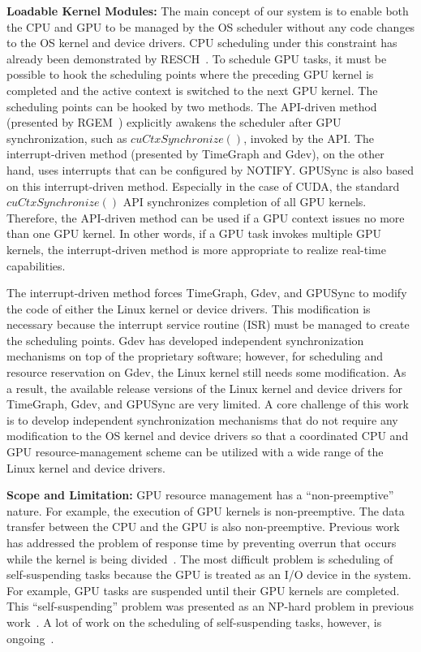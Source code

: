 \textbf{Loadable Kernel Modules:}
 The main concept of our system is to enable both the CPU and GPU to be managed by the OS scheduler without any code changes to the OS kernel and device drivers.
CPU scheduling under this constraint has already been demonstrated by RESCH~\cite{kato2009loadable, asberg2012exsched}.
To schedule GPU tasks, it must be possible to hook the scheduling points where the preceding GPU kernel is completed and the active context is switched to the next GPU kernel.
The scheduling points can be hooked by two methods.
The API-driven method (presented by RGEM~\cite{kato:rgem}) explicitly awakens the scheduler after GPU synchronization, such as $cuCtxSynchronize()$, invoked by the API.
The interrupt-driven method (presented by TimeGraph and Gdev), on the other hand, uses interrupts that can be configured by NOTIFY.
GPUSync is also based on this interrupt-driven method.
Especially in the case of CUDA, the standard $cuCtxSynchronize()$ API synchronizes completion of all GPU kernels.
Therefore, the API-driven method can be used if a GPU context issues no more than one GPU kernel.
In other words, if a GPU task invokes multiple GPU kernels, the interrupt-driven method is more appropriate to realize real-time capabilities.


The interrupt-driven method forces TimeGraph, Gdev, and GPUSync to modify the code of either the Linux kernel or device drivers.
This modification is necessary because the interrupt service routine (ISR) must be managed to create the scheduling points.
Gdev has developed independent synchronization mechanisms on top of the proprietary software; however, for scheduling and resource reservation on Gdev, the Linux kernel still needs some modification.
As a result, the available release versions of the Linux kernel and device drivers for TimeGraph, Gdev, and GPUSync are very limited.
A core challenge of this work is to develop independent synchronization mechanisms that do not require any modification to the OS kernel and device drivers so that a coordinated CPU and GPU resource-management scheme can be utilized with a wide range of the Linux kernel and device drivers.

\textbf{Scope and Limitation:} 
GPU resource management has a ``non-preemptive'' nature.
For example, the execution of GPU kernels is non-preemptive.
The data transfer between the CPU and the GPU is also non-preemptive.
Previous work has addressed the problem of response time by preventing overrun that occurs while the kernel is being divided~\cite{basaran:preemptive,sparc}.
The most difficult problem is scheduling of self-suspending tasks because the GPU is treated as an I/O device in the system.
For example, GPU tasks are suspended until their GPU kernels are completed.
This ``self-suspending'' problem was presented as an NP-hard problem in previous work~\cite{self-sus:1,self-sus:2}.
A lot of work on the scheduling of self-suspending tasks, however, is ongoing~\cite{chattopadhyay2014limited,kim2013segment}.

